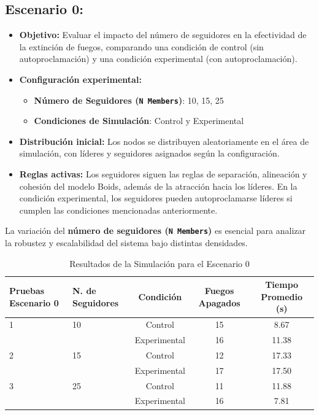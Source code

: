 \documentclass{article}
\begin{document}
\subsection{Escenario 0:}
\begin{itemize}
\item \textbf{Objetivo:} Evaluar el impacto del número de seguidores en la efectividad de la extinción de fuegos, comparando una condición de control (sin autoproclamación) y una condición experimental (con autoproclamación).
\item \textbf{Configuración experimental:}
\begin{itemize}
  \item \textbf{Número de Seguidores (\texttt{N Members})}: 10, 15, 25
  \item \textbf{Condiciones de Simulación}: Control y Experimental
\end{itemize}
\item \textbf{Distribución inicial:} Los nodos se distribuyen aleatoriamente en el área de simulación, con líderes y seguidores asignados según la configuración.
\item \textbf{Reglas activas:} Los seguidores siguen las reglas de separación, alineación y cohesión del modelo Boids, además de la atracción hacia los líderes. En la condición experimental, los seguidores pueden autoproclamarse líderes si cumplen las condiciones mencionadas anteriormente.
\end{itemize}
La variación del \textbf{número de seguidores (\texttt{N Members})} es esencial para analizar la robustez y escalabilidad del sistema bajo distintas densidades.

\begin{table}[H]
\centering
\caption{Resultados de la Simulación para el Escenario 0}
\label{tab:results}
\begin{tabular}{llccc}
\toprule
\textbf{Pruebas Escenario 0} & \textbf{N. de Seguidores} & \textbf{Condición} & \textbf{Fuegos Apagados} & \textbf{Tiempo Promedio (s)} \\
\midrule
1 & 10 & Control      & 15 & 8.67  \\
  &    & Experimental & 16 & 11.38 \\
\midrule
2 & 15 & Control      & 12 & 17.33 \\
  &    & Experimental & 17 & 17.50 \\
\midrule
3 & 25 & Control      & 11 & 11.88 \\
  &    & Experimental & 16 & 7.81  \\
\bottomrule
\end{tabular}
\end{table}
\end{document}
